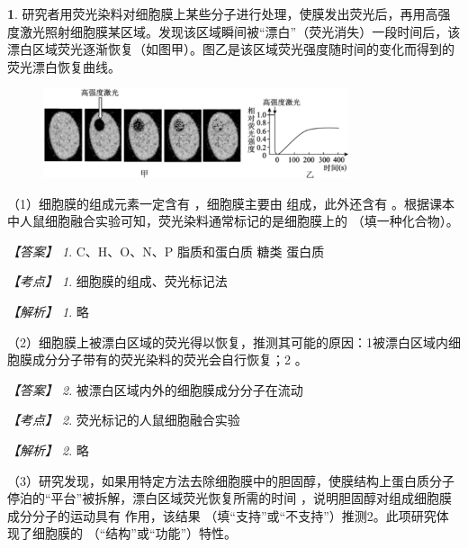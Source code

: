 \documentclass[UTF8, 10pt, a4paper, oneside]{ctexart}
\newcommand{\blank}{ \underbar{\quad$\blacktriangle$\quad} }%
\newcommand{\fs}[1]{{\fangsong #1}}%
\newcommand{\circled}[1]{{\small{\textcircled{\tiny{#1}}}}}%
\theoremstyle{definition}
\newtheorem{exercise}{}
\theoremstyle{remark}
\newtheorem*{answer}{【答案】}
\newtheorem*{point}{【考点】}      %
\newtheorem*{explanation}{【解析】}     %
\theoremstyle{plain}
\begin{document}
\begin{exercise}
    研究者用荧光染料对细胞膜上某些分子进行处理，使膜发出荧光后，再用高强度激光照射细胞膜某区域。发现该区域瞬间被“漂白”（荧光消失）一段时间后，该漂白区域荧光逐渐恢复（如图甲）。图乙是该区域荧光强度随时间的变化而得到的荧光漂白恢复曲线。
    
    \begin{figure}[h!]
        \centering
        \includegraphics[width=0.8\textwidth]{assists/d2-1.jpg}
    \end{figure}

    （1）细胞膜的组成元素一定含有\blank，细胞膜主要由\blank 组成，此外还含有\blank。根据课本中人鼠细胞融合实验可知，荧光染料通常标记的是细胞膜上的\blank（填一种化合物）。

    \begin{answer}
        C、H、O、N、P \qquad 脂质和蛋白质 \qquad 糖类 \qquad 蛋白质
    \end{answer}
    \begin{point}
        细胞膜的组成、荧光标记法
    \end{point}
    \begin{explanation}
        \fs{略}
    \end{explanation}

    （2）细胞膜上被漂白区域的荧光得以恢复，推测其可能的原因：\circled{1}被漂白区域内细胞膜成分分子带有的荧光染料的荧光会自行恢复；\circled{2}\blank。

    \begin{answer}
        被漂白区域内外的细胞膜成分分子在流动
    \end{answer}
    \begin{point}
        荧光标记的人鼠细胞融合实验
    \end{point}
    \begin{explanation}
        \fs{略}
    \end{explanation}

    （3）研究发现，如果用特定方法去除细胞膜中的胆固醇，使膜结构上蛋白质分子停泊的“平台”被拆解，漂白区域荧光恢复所需的时间\blank，说明胆固醇对组成细胞膜成分分子的运动具有\blank 作用，该结果\blank（填“支持”或“不支持”）推测\circled{2}。此项研究体现了细胞膜的\blank（“结构”或“功能”）特性。


\end{exercise}
\end{document}
